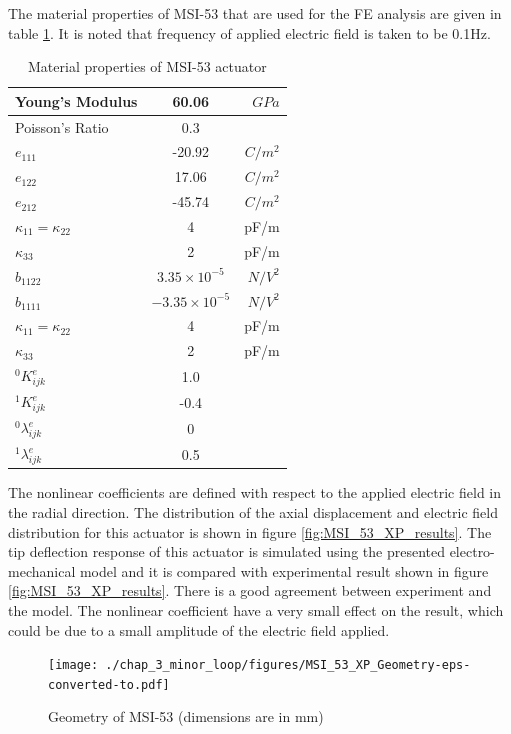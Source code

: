 The material properties of MSI-53 that are used for the FE analysis are given in table \ref{table:MatPZT_MSI_53}. 
It is noted that frequency of applied electric field is taken to be 0.1Hz. 
\begin{table}
\caption{Material properties of MSI-53 actuator \cite{Alexander}}
\centering
\begin{tabular}{|l|c|r|}
\hline 
Young's Modulus&60.06&$GPa$\\ \hline
Poisson's Ratio&$0.3$&\\ \hline 
$e_{111}$ &-20.92&$C/m^2$\\ \hline
$e_{122}$ &17.06&$C/m^2$\\ \hline
$e_{212}$ &-45.74&$C/m^2$\\ \hline
$\kappa_{11}=\kappa_{22}$ & 4 & pF/m\\ \hline
$\kappa_{33}$ & 2 & pF/m \\ \hline
$\widehat{b}_{1122} $ & $3.35 \times 10^{-5}$ &  $N/V^2$ \\ \hline
$\widehat{b}_{1111} $ & $-3.35 \times 10^{-5}$ & $N/V^2$ \\ \hline
$\kappa_{11}=\kappa_{22}$ & 4 & pF/m \\ \hline
$\kappa_{33}$ & 2 & pF/m \\ \hline
${}^{0}K_{ijk}^{e}$&1.0&\\ \hline
${}^{1}K_{ijk}^{e}$&-0.4&\\ \hline
${}^{0}\lambda_{ijk}^{e}$&0&\\ \hline
${}^{1}\lambda_{ijk}^{e}$&0.5&\\ \hline 
\end{tabular}
\label{table:MatPZT_MSI_53} 
\end{table}
The nonlinear coefficients are defined with respect to the applied electric field in the radial direction.
The distribution of the axial displacement and electric field distribution for this actuator is shown in figure \ref{fig:MSI_53_XP_results}. 
The tip deflection response of this actuator is simulated using the presented electro-mechanical model and it is compared with experimental result shown in figure \ref{fig:MSI_53_XP_results}. 
There is a good agreement between experiment and the model. 
The nonlinear coefficient have a very small effect on the result, which could be due to a small amplitude of the electric field applied.

\begin{figure}
\centering
\texttt{[image: ./chap\_3\_minor\_loop/figures/MSI\_53\_XP\_Geometry-eps-converted-to.pdf]}
\caption{Geometry of MSI-53 (dimensions are in mm)}
\label{fig:MSI_53_Geometry}
\end{figure}


